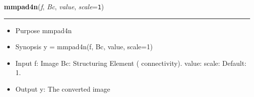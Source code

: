     \label{multireg:num_pymorph:mmpad4n}
    \vspace{0.5ex}

    \begin{boxedminipage}{\textwidth}

    \raggedright \textbf{mmpad4n}(\textit{f}, \textit{Bc}, \textit{value}, \textit{scale}=\texttt{1\-})

    \vspace{-1.5ex}

    \rule{\textwidth}{0.5\fboxrule}
    \begin{itemize}
    \setlength{\parskip}{0.6ex}
      \item Purpose mmpad4n

      \item Synopsis y = mmpad4n(f, Bc, value, scale=1)

      \item Input f: Image Bc: Structuring Element ( connectivity). value: 
        scale: Default: 1.

      \item Output y: The converted image

    \end{itemize}

    \vspace{1ex}

    \end{boxedminipage}

    \label{multireg:num_pymorph:mmpatspec}
    \vspace{0.5ex}

